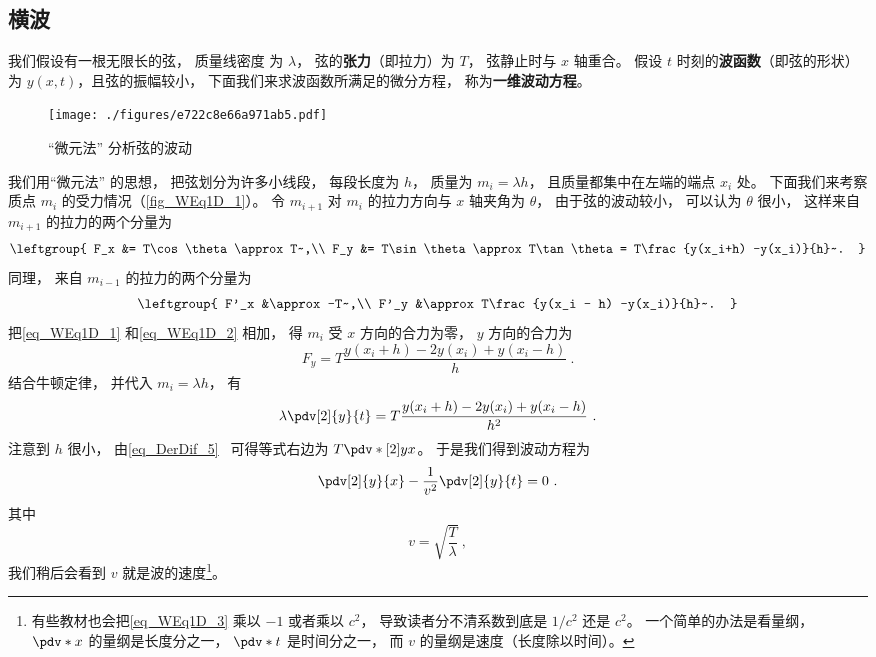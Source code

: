 

\subsection{横波}
我们假设有一根无限长的弦， 质量线密度%
为 $\lambda$， 弦的\textbf{张力}（即拉力）为 $T$， 弦静止时与 $x$ 轴重合。 假设 $t$ 时刻的\textbf{波函数}（即弦的形状）为 $y(x, t)$，且弦的振幅较小， 下面我们来求波函数所满足的微分方程， 称为\textbf{一维波动方程}。

\begin{figure}[ht]
\centering
\texttt{[image: ./figures/e722c8e66a971ab5.pdf]}
\caption{“微元法” 分析弦的波动} \label{fig_WEq1D_1}
\end{figure}

我们用“微元法” 的思想， 把弦划分为许多小线段， 每段长度为 $h$， 质量为 $m_i = \lambda h$， 且质量都集中在左端的端点 $x_i$ 处。 下面我们来考察质点 $m_i$ 的受力情况（\autoref{fig_WEq1D_1}）。 令 $m_{i+1}$ 对 $m_i$ 的拉力方向与 $x$ 轴夹角为 $\theta$， 由于弦的波动较小， 可以认为 $\theta$ 很小， 这样来自 $m_{i+1}$ 的拉力的两个分量为
\begin{equation}\label{eq_WEq1D_1}
\leftgroup{
F_x &= T\cos\theta \approx T~,\\
F_y &= T\sin\theta \approx T\tan\theta = T\frac{y(x_i+h) -y(x_i)}{h}~.
}\end{equation}
同理， 来自 $m_{i-1}$ 的拉力的两个分量为
\begin{equation}\label{eq_WEq1D_2}
\leftgroup{
F'_x &\approx -T~,\\
F'_y &\approx T\frac{y(x_i - h) -y(x_i)}{h}~.
}\end{equation}
把\autoref{eq_WEq1D_1} 和\autoref{eq_WEq1D_2} 相加， 得 $m_i$ 受 $x$ 方向的合力为零， $y$ 方向的合力为
\begin{equation}
F_y = T\frac{y(x_i+h) - 2y(x_i) + y(x_i-h)}{h}~.
\end{equation}
结合牛顿定律， 并代入 $m_i = \lambda h$， 有
\begin{equation}
\lambda \pdv[2]{y}{t} = T\frac{y(x_i+h) - 2y(x_i) + y(x_i-h)}{h^2}~.
\end{equation}
注意到 $h$ 很小， 由\autoref{eq_DerDif_5}~ 可得等式右边为 $T\pdv*[2]{y}{x}$。 于是我们得到波动方程为
\begin{equation}\label{eq_WEq1D_3}
\pdv[2]{y}{x} - \frac{1}{v^2}\pdv[2]{y}{t} = 0~.
\end{equation}
其中
\begin{equation}
v = \sqrt{\frac{T}{\lambda}}~,
\end{equation}
我们稍后会看到 $v$ 就是波的速度\footnote{有些教材也会把\autoref{eq_WEq1D_3} 乘以 $-1$ 或者乘以 $c^2$， 导致读者分不清系数到底是 $1/c^2$ 还是 $c^2$。 一个简单的办法是看量纲， $\pdv*{x}$ 的量纲是长度分之一， $\pdv*{t}$ 是时间分之一， 而 $v$ 的量纲是速度（长度除以时间）。}。

